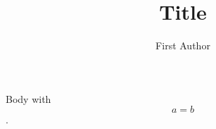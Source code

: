 \documentclass{llncs}
\title{Title}
\author{First Author\inst{1}}
\institute{First university}
\begin{document}
\maketitle
Body with \[a=b\].
\end{document}
